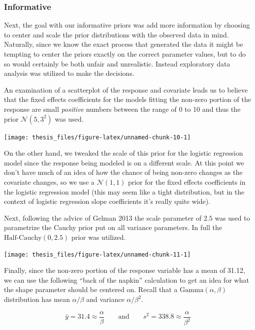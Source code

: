 \documentclass[12pt,twoside]{reedthesis}
\begin{document}
\hypertarget{informative}{%
\subsubsection{Informative}\label{informative}}

Next, the goal with our informative priors was add more information by choosing to center and scale the prior distributions with the observed data in mind. Naturally, since we know the exact process that generated the data it might be tempting to center the priors exactly on the correct parameter values, but to do so would certainly be both unfair and unrealistic. Instead exploratory data analysis was utilized to make the decisions.

An examination of a scatterplot of the response and covariate leads us to believe that the fixed effects coefficients for the models fitting the non-zero portion of the response are small \emph{positive} numbers between the range of 0 to 10 and thus the prior \(\mathcal{N}(5, 3^2)\) was used.
\begin{center}\texttt{[image: thesis\_files/figure-latex/unnamed-chunk-10-1]} \end{center}

On the other hand, we tweaked the scale of this prior for the logistic regression model since the response being modeled is on a different scale. At this point we don't have much of an idea of how the chance of being non-zero changes as the covariate changes, so we use a \(\mathcal{N}(1,1)\) prior for the fixed effects coefficients in the logistic regression model (this may seem like a tight distribution, but in the context of logistic regression slope coefficients it's really quite wide).

Next, following the advice of Gelman 2013 the scale parameter of \(2.5\) was used to parametrize the Cauchy prior put on all variance parameters. In full the \(\text{Half-Cauchy}(0, 2.5)\) prior was utilized.
\begin{center}\texttt{[image: thesis\_files/figure-latex/unnamed-chunk-11-1]} \end{center}

Finally, since the non-zero portion of the response variable has a mean of 31.12, we can use the following ``back of the napkin'' calculation to get an idea for what the shape parameter should be centered on. Recall that a \(\text{Gamma}(\alpha, \beta)\) distribution has mean \(\alpha / \beta\) and variance \(\alpha / \beta^2\).

\[
\bar{y} = 31.4 \approx \frac{\alpha}{\beta}\qquad \text{and} \qquad s^2 = 338.8 \approx \frac{\alpha}{\beta^2}
\]
\end{document}
